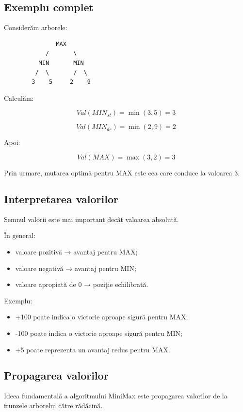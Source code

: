 \documentclass[12pt,a4paper]{article}
\begin{document}
\subsection{Exemplu complet}

Considerăm arborele:

\begin{verbatim}
               MAX
            /       \
          MIN       MIN
         /  \       /  \
        3    5     2    9
\end{verbatim}

Calculăm:

\[
Val(MIN_{st})=\min(3,5)=3
\]

\[
Val(MIN_{dr})=\min(2,9)=2
\]

Apoi:

\[
Val(MAX)=\max(3,2)=3
\]

Prin urmare, mutarea optimă pentru MAX este cea care conduce la valoarea 3.

\subsection{Interpretarea valorilor}

Semnul valorii este mai important decât valoarea absolută.

În general:

\begin{itemize}
\item valoare pozitivă → avantaj pentru MAX;
\item valoare negativă → avantaj pentru MIN;
\item valoare apropiată de 0 → poziție echilibrată.
\end{itemize}

Exemplu:

\begin{itemize}
\item +100 poate indica o victorie aproape sigură pentru MAX;
\item -100 poate indica o victorie aproape sigură pentru MIN;
\item +5 poate reprezenta un avantaj redus pentru MAX.
\end{itemize}

\subsection{Propagarea valorilor}

Ideea fundamentală a algoritmului MiniMax este propagarea valorilor de la frunzele arborelui către rădăcină.
\end{document}

